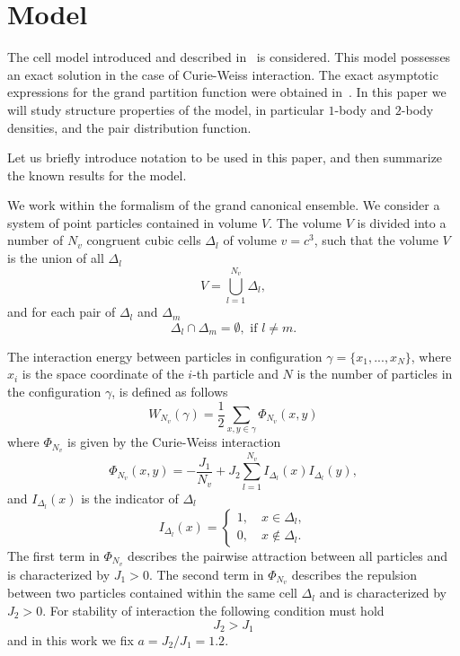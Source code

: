 \section{\label{sec:model} Model}
The cell model introduced and described in~\cite{KKD2018book,KKD2020} is considered. This model possesses an exact solution in the case of Curie-Weiss interaction. The exact asymptotic expressions for the grand partition function were obtained in~\cite{KKD2020}. In this paper we will study structure properties of the model, in particular $1$-body and $2$-body densities, and the pair distribution function.

Let us briefly introduce notation to be used in this paper, and then summarize the known results for the model.

We work within the formalism of the grand canonical ensemble. We consider a system of point particles contained in volume $V$. The volume $V$ is divided into a number of $N_v$ congruent cubic cells $\Delta_l$ of volume $v=c^3$, such that the volume $V$ is the union of all $\Delta_l$
\begin{equation*}
	V = \bigcup_{l=1}^{N_v}\Delta_l,
\end{equation*}
and for each pair of $\Delta_l$ and $\Delta_m$
\begin{equation*}
	\Delta_l \cap \Delta_m = \emptyset, \text{ if } l \neq m.
\end{equation*}

The interaction energy between particles in configuration $\gamma = \{x_1, ..., x_N\}$, where $x_i$ is the space coordinate of the $i$-th particle and $N$ is the number of particles in the configuration $\gamma$, is defined as follows
\begin{equation*}
	W_{N_v}(\gamma) = \frac{1}{2} \sum_{x,y \in \gamma} \Phi_{N_v} (x,y)
\end{equation*}
where $\Phi_{N_v}$ is given by the Curie-Weiss interaction
\begin{equation}
	\label{def:curie-weiss-pot}
	\Phi_{N_v}(x, y) = -\frac{J_1}{N_v} + J_2\sum_{l=1}^{N_v} I_{\Delta_l}(x) I_{\Delta_l}(y),
\end{equation}
and $I_{\Delta_l}(x)$ is the indicator of $\Delta_l$
\begin{equation*}
	I_{\Delta_l} (x) = \left\{
	\begin{array}{ll}
		1, \quad x \in \Delta_l,
		\\
		0, \quad x \notin \Delta_l.
	\end{array}
	\right.
\end{equation*}
The first term in $\Phi_{N_v}$ describes the pairwise attraction between all particles and is characterized by $J_1 > 0$. The second term in $\Phi_{N_v}$ describes the repulsion between two particles contained within the same cell $\Delta_l$ and is characterized by $J_2 > 0.$ For stability of interaction the following condition must hold
\begin{equation*}
	J_2 > J_1
\end{equation*}
and in this work we fix $a = J_2/J_1 = 1.2$.

